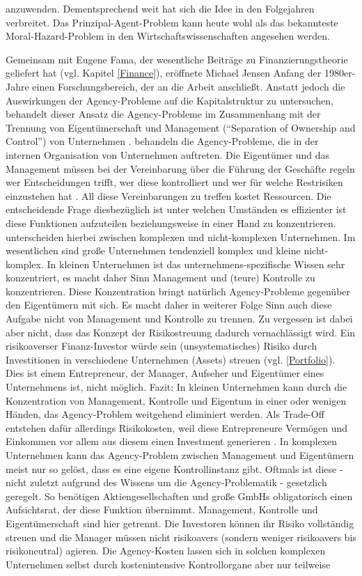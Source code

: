 anzuwenden. Dementsprechend weit hat sich die Idee in den Folgejahren verbreitet. Das Prinzipal-Agent-Problem kann heute wohl als das bekannteste Moral-Hazard-Problem in den Wirtschaftswissenschaften angesehen werden.

Gemeinsam mit Eugene Fama, der wesentliche Beiträge zu Finanzierungstheorie geliefert hat (vgl. Kapitel \ref{Finance}), eröffnete Michael Jensen Anfang der 1980er-Jahre einen Forschungsbereich, der an die Arbeit \textcite{Jensen1976} anschließt. Anstatt jedoch die Auswirkungen der Agency-Probleme auf die Kapitalstruktur zu untersuchen, behandelt dieser Ansatz die Agency-Probleme im Zusammenhang mit der Trennung von Eigentümerschaft und Management ("`Separation of Ownership and Control"') von Unternehmen \parencite[S. 86]{Erlei2016}. \textcite{Fama1983a} behandeln die Agency-Probleme, die in der internen Organisation von Unternehmen auftreten. Die Eigentümer und das Management müssen bei der Vereinbarung über die Führung der Geschäfte regeln wer Entscheidungen trifft, wer diese kontrolliert und wer für welche Restrisiken einzustehen hat \parencite[S. 304]{Fama1983a}. All diese Vereinbarungen zu treffen kostet Ressourcen. Die entscheidende Frage diesbezüglich ist unter welchen Umständen es effizienter ist diese Funktionen aufzuteilen beziehungsweise in einer Hand zu konzentrieren. \textcite{Fama1983a} unterscheiden hierbei zwischen komplexen und nicht-komplexen Unternehmen. Im wesentlichen sind große Unternehmen tendenziell komplex und kleine nicht-komplex. In kleinen Unternehmen ist das unternehmens-spezifische Wissen sehr konzentriert, es macht daher Sinn Management und (teure) Kontrolle zu konzentrieren. Diese Konzentration bringt natürlich Agency-Probleme gegenüber den Eigentümern mit sich. Es macht daher in weiterer Folge Sinn auch diese Aufgabe nicht von Management und Kontrolle zu trennen. Zu vergessen ist dabei aber nicht, dass das Konzept der Risikostreuung dadurch vernachlässigt wird. Ein risikoaverser Finanz-Investor würde sein (unsystematisches) Risiko durch Investitionen in verschiedene Unternehmen (Assets) streuen (vgl. \ref{Portfolio}). Dies ist einem Entrepreneur, der Manager, Aufseher und Eigentümer eines Unternehmens ist, nicht möglich. Fazit: In kleinen Unternehmen kann durch die Konzentration von Management, Kontrolle und Eigentum in einer oder wenigen Händen, das Agency-Problem weitgehend eliminiert werden. Als Trade-Off entstehen dafür allerdings Risikokosten, weil diese Entrepreneure Vermögen und Einkommen vor allem aus diesem einen Investment generieren \parencite[S. 306]{Fama1983a}. In komplexen Unternehmen kann das Agency-Problem zwischen Management und Eigentümern meist nur so gelöst, dass es eine eigene Kontrollinstanz gibt. Oftmals ist diese - nicht zuletzt aufgrund des Wissens um die Agency-Problematik - gesetzlich geregelt. So benötigen Aktiengesellschaften und große GmbHs obligatorisch einen Aufsichtsrat, der diese Funktion übernimmt. Management, Kontrolle und Eigentümerschaft sind hier getrennt. Die Investoren können ihr Risiko vollständig streuen und die Manager müssen nicht risikoavers (sondern weniger risikoavers bis risikoneutral) agieren. Die Agency-Kosten lassen sich in solchen komplexen Unternehmen selbst durch kostenintensive Kontrollorgane aber nur teilweise 